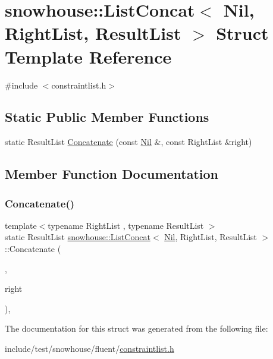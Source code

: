 \hypertarget{structsnowhouse_1_1ListConcat_3_01Nil_00_01RightList_00_01ResultList_01_4}{}\section{snowhouse\+::List\+Concat$<$ Nil, Right\+List, Result\+List $>$ Struct Template Reference}
\label{structsnowhouse_1_1ListConcat_3_01Nil_00_01RightList_00_01ResultList_01_4}


{\ttfamily \#include $<$constraintlist.\+h$>$}

\subsection*{Static Public Member Functions}
\begin{DoxyCompactItemize}
\item 
static Result\+List \mbox{\hyperlink{structsnowhouse_1_1ListConcat_3_01Nil_00_01RightList_00_01ResultList_01_4_a07c66661a93bf46f80fb0578c0e25113}{Concatenate}} (const \mbox{\hyperlink{structsnowhouse_1_1Nil}{Nil}} \&, const Right\+List \&right)
\end{DoxyCompactItemize}


\subsection{Member Function Documentation}
\mbox{\label{structsnowhouse_1_1ListConcat_3_01Nil_00_01RightList_00_01ResultList_01_4_a07c66661a93bf46f80fb0578c0e25113}} 
\subsubsection{\texorpdfstring{Concatenate()}{Concatenate()}}
{\footnotesize\ttfamily template$<$typename Right\+List , typename Result\+List $>$ \\
static Result\+List \mbox{\hyperlink{structsnowhouse_1_1ListConcat}{snowhouse\+::\+List\+Concat}}$<$ \mbox{\hyperlink{structsnowhouse_1_1Nil}{Nil}}, Right\+List, Result\+List $>$\+::Concatenate (\begin{DoxyParamCaption}\item[{const \mbox{\hyperlink{structsnowhouse_1_1Nil}{Nil}} \&}]{,  }\item[{const Right\+List \&}]{right }\end{DoxyParamCaption})\hspace{0.3cm}{\ttfamily [inline]}, {\ttfamily [static]}}



The documentation for this struct was generated from the following file\+:\begin{DoxyCompactItemize}
\item 
include/test/snowhouse/fluent/\mbox{\hyperlink{constraintlist_8h}{constraintlist.\+h}}\end{DoxyCompactItemize}
